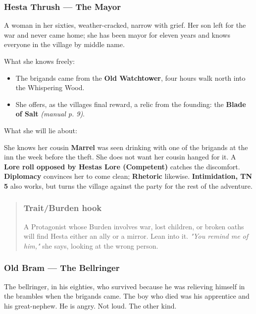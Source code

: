 \documentclass[10pt,a4paper]{article}
\newcommand{\tightlist}{\setlength{\itemsep}{0pt}\setlength{\parskip}{0pt}}
\begin{document}
\subsubsection{Hesta Thrush --- The Mayor}\label{hesta-thrush--the-mayor}

A woman in her sixties, weather-cracked, narrow with grief. Her son left for the war and never came home; she has been mayor for eleven years and knows everyone in the village by middle name.

What she knows freely:

\begin{itemize}
\tightlist
\item
  The brigands came from the \textbf{Old Watchtower}, four hours\textquotesingle{} walk north into the Whispering Wood.
\item
  She offers, as the village\textquotesingle s final reward, a relic from the founding: the \textbf{Blade of Salt} \emph{(manual p. 9)}.
\end{itemize}

What she will lie about:

She knows her cousin \textbf{Marrel} was seen drinking with one of the brigands at the inn the week before the theft. She does not want her cousin hanged for it. A \textbf{Lore roll opposed by Hesta\textquotesingle s Lore (Competent)} catches the discomfort. \textbf{Diplomacy} convinces her to come clean; \textbf{Rhetoric} likewise. \textbf{Intimidation, TN 5} also works, but turns the village against the party for the rest of the adventure.

\begin{quote}
\subsubsection{Trait/Burden hook}\label{traitburden-hook}

A Protagonist whose Burden involves war, lost children, or broken oaths will find Hesta either an ally or a mirror. Lean into it. \emph{"You remind me of him,"} she says, looking at the wrong person.
\end{quote}

\subsubsection{Old Bram --- The Bellringer}\label{old-bram--the-bellringer}

The bellringer, in his eighties, who survived because he was relieving himself in the brambles when the brigands came. The boy who died was his apprentice and his great-nephew. He is angry. Not loud. The other kind.
\end{document}

